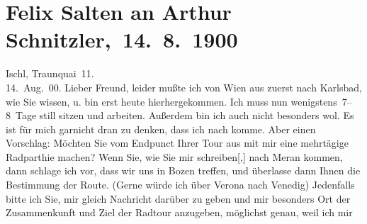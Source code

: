 

         
         \renewcommand{\erwaehntePersonen}{Personen: Oskar Mayer, Felix Salten}
         \renewcommand{\erwaehnteOrte}{Orte: Ala, Bad Ischl, Bludenz, Bozen, Innsbruck, Karlsbad, Meran, Schruns, Schweiz, Traunkai, Triest, Venedig, Verona, Wien}
         \renewcommand{\erwaehnteWerke}{}
               \section[ Felix Salten an Arthur Schnitzler, 14. 8. 1900]{ Felix Salten an Arthur Schnitzler, 14. 8. 1900}\nopagebreak{}\rehead{ }\begin{ledgroupsized}[t]{13cm}\normalsize\beginnumbering \toendnotes[C]{\smallbreak\pagebreak[2]} 
\toendnotes[C]{\smallbreak}\pstart
           \raggedleft{}{\pb}Ischl, Traunquai 11. {\\}14. Aug. 00.\pend
           \pstart
           Lieber Freund, leider mußte ich von Wien aus zuerst nach Karlsbad, wie Sie
               wissen, u. bin erst heute hierhergekommen. Ich muss
               nun wenigstens 7–8 Tage still sitzen und arbeiten. Außerdem bin ich auch nicht
               besonders wol. Es ist für mich garnicht dran zu denken, dass ich nach \label{K_L03310-1v}\label{K_L03310-1h} komme. Aber einen Vorschlag: Möchten Sie vom Endpunct Ihrer Tour aus mit mir
               eine mehrtägige Radparthie machen? Wenn Sie, wie Sie mir
                  schreiben{[},{]} nach Meran
               kommen, dann schlage ich vor, dass wir uns in Bozen treffen, und überlasse dann Ihnen die Bestimmung der Route. (Gerne {\pb}würde ich über Verona nach Venedig)
               Jedenfalls bitte ich Sie, mir gleich Nachricht darüber zu geben und mir besonders Ort
               der Zusammenkunft und Ziel der Radtour anzugeben, möglichst genau, weil ich mir

\end{ledgroupsized}
